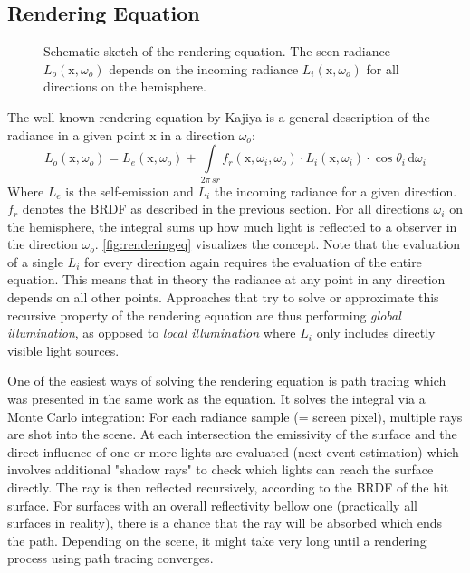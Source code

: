 \documentclass[thesis.tex]{subfiles}
\begin{document}
\subsection{Rendering Equation} \label{sec:preq:renderingeq}
\begin{figure}[h]
\centering
{}
\caption{Schematic sketch of the rendering equation. The seen radiance $L_o(\mathrm{x}, \omega_o)$ depends on the incoming radiance $L_i(\mathrm{x}, \omega_o)$ for all directions on the hemisphere.}
\label{fig:renderingeq}
\end{figure}
The well-known rendering equation by Kajiya \cite{bib:renderingequation} is a general description of the radiance in a given point $\mathrm{x}$ in a direction $\omega_o$:
\begin{equation}
L_o(\mathrm{x}, \omega_o) = L_e(\mathrm{x}, \omega_o) + \int\limits_{2\pi\,sr} f_r(\mathrm{x}, \omega_i, \omega_o) \cdot L_i(\mathrm{x}, \omega_i) \cdot \cos\theta_i \, \mathrm{d}\omega_i
\end{equation}
Where $L_e$ is the self-emission and $L_i$ the incoming radiance for a given direction.
$f_r$ denotes the BRDF as described in the previous section.
For all directions $\omega_i$ on the hemisphere, the integral sums up how much light is reflected to a observer in the direction $\omega_o$.
\autoref{fig:renderingeq} visualizes the concept.
Note that the evaluation of a single $L_i$ for every direction again requires the evaluation of the entire equation.
This means that in theory the radiance at any point in any direction depends on all other points.
Approaches that try to solve or approximate this recursive property of the rendering equation are thus performing \emph{global illumination}, as opposed to \emph{local illumination} where $L_i$ only includes directly visible light sources.

One of the easiest ways of solving the rendering equation is path tracing which was presented in the same work as the equation.
It solves the integral via a Monte Carlo integration:
For each radiance sample (= screen pixel), multiple rays are shot into the scene.
At each intersection the emissivity of the surface and the direct influence of one or more lights are evaluated (next event estimation) which involves additional "shadow rays" to check which lights can reach the surface directly. 
The ray is then reflected recursively, according to the BRDF of the hit surface.
For surfaces with an overall reflectivity bellow one (practically all surfaces in reality), there is a chance that the ray will be absorbed which ends the path.
Depending on the scene, it might take very long until a rendering process using path tracing converges.
\end{document}
